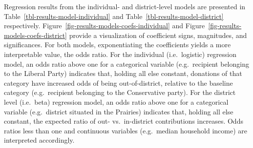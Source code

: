 \documentclass[
  letterpaper,
  DIV=11,
  numbers=noendperiod]{scrartcl}
\begin{document}
Regression results from the individual- and district-level models are
presented in Table~\ref{tbl-results-model-individual} and
Table~\ref{tbl-results-model-district} respectively.
Figure~\ref{fig-results-models-coefs-individual} and
Figure~\ref{fig-results-models-coefs-district} provide a visualization
of coefficient signs, magnitudes, and significances. For both models,
exponentiating the coefficients yields a more interpretable value, the
odds ratio. For the individual (i.e.~logistic) regression model, an odds
ratio above one for a categorical variable (e.g.~recipient belonging to
the Liberal Party) indicates that, holding all else constant, donations
of that category have increased odds of being out-of-district, relative
to the baseline category (e.g.~recipient belonging to the Conservative
party). For the district level (i.e.~beta) regression model, an odds
ratio above one for a categorical variable (e.g.~district situated in
the Prairies) indicates that, holding all else constant, the expected
ratio of out- vs.~in-district contributions increases. Odds ratios less
than one and continuous variables (e.g.~median household income) are
interpreted accordingly.
\end{document}
